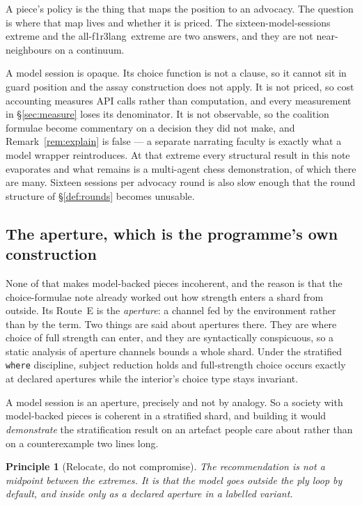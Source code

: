 \documentclass[11pt,a4paper]{article}
\theoremstyle{plain}
\newtheorem{principle}[theorem]{Principle}
\theoremstyle{definition}
\theoremstyle{remark}
\newcommand{\flang}{\textsf{f1r3lang}}
\begin{document}
A piece's policy is the thing that maps the position to an advocacy. The
question is where that map lives and whether it is priced. The
sixteen-model-sessions extreme and the all-\flang\ extreme are two answers,
and they are not near-neighbours on a continuum.

A model session is opaque. Its choice function is not a clause, so it cannot sit
in guard position and the assay construction does not apply. It is not priced,
so cost accounting measures API calls rather than computation, and every
measurement in \S\ref{sec:measure} loses its denominator. It is not observable,
so the coalition formulae become commentary on a decision they did not make, and
Remark~\ref{rem:explain} is false --- a separate narrating faculty is exactly
what a model wrapper reintroduces. At that extreme every structural result in
this note evaporates and what remains is a multi-agent chess demonstration, of
which there are many. Sixteen sessions per advocacy round is also slow enough
that the round structure of \S\ref{def:rounds} becomes unusable.

\subsection{The aperture, which is the programme's own construction}

None of that makes model-backed pieces incoherent, and the reason is that the
choice-formulae note already worked out how strength enters a shard from
outside. Its Route~E is the \emph{aperture}: a channel fed by the environment
rather than by the term. Two things are said about apertures there. They are
where choice of full strength can enter, and they are syntactically conspicuous,
so a static analysis of aperture channels bounds a whole shard. Under the
stratified \texttt{where} discipline, subject reduction holds and full-strength
choice occurs exactly at declared apertures while the interior's choice type
stays invariant.

A model session is an aperture, precisely and not by analogy. So a society with
model-backed pieces is coherent in a stratified shard, and building it would
\emph{demonstrate} the stratification result on an artefact people care about
rather than on a counterexample two lines long.

\begin{principle}[Relocate, do not compromise]
\label{prin:relocate}
The recommendation is not a midpoint between the extremes. It is that the model
goes outside the ply loop by default, and inside only as a declared aperture in
a labelled variant.
\end{principle}
\end{document}
